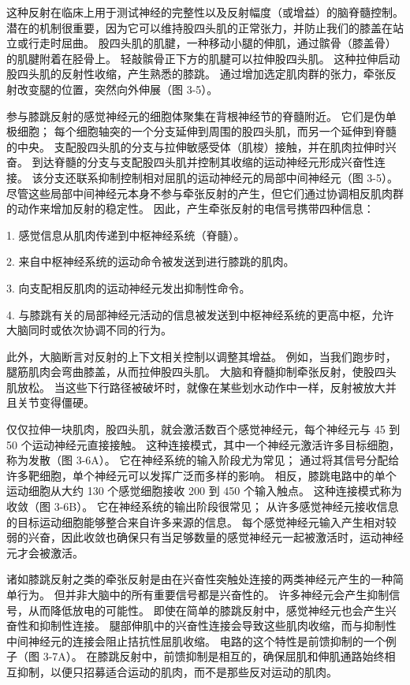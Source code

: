 这种反射在临床上用于测试神经的完整性以及反射幅度（或增益）的脑脊髓控制。 潜在的机制很重要，因为它可以维持股四头肌的正常张力，并防止我们的膝盖在站立或行走时屈曲。 股四头肌的肌腱，一种移动小腿的伸肌，通过髌骨（膝盖骨）的肌腱附着在胫骨上。 轻敲髌骨正下方的肌腱可以拉伸股四头肌。 这种拉伸启动股四头肌的反射性收缩，产生熟悉的膝跳。 通过增加选定肌肉群的张力，牵张反射改变腿的位置，突然向外伸展（图 3-5）。

参与膝跳反射的感觉神经元的细胞体聚集在背根神经节的脊髓附近。 它们是伪单极细胞； 每个细胞轴突的一个分支延伸到周围的股四头肌，而另一个延伸到脊髓的中央。 支配股四头肌的分支与拉伸敏感受体（肌梭）接触，并在肌肉拉伸时兴奋。 到达脊髓的分支与支配股四头肌并控制其收缩的运动神经元形成兴奋性连接。 该分支还联系抑制控制相对屈肌的运动神经元的局部中间神经元（图 3-5）。 尽管这些局部中间神经元本身不参与牵张反射的产生，但它们通过协调相反肌肉群的动作来增加反射的稳定性。 因此，产生牵张反射的电信号携带四种信息：

1. 感觉信息从肌肉传递到中枢神经系统（脊髓）。

2. 来自中枢神经系统的运动命令被发送到进行膝跳的肌肉。

3. 向支配相反肌肉的运动神经元发出抑制性命令。

4. 与膝跳有关的局部神经元活动的信息被发送到中枢神经系统的更高中枢，允许大脑同时或依次协调不同的行为。

此外，大脑断言对反射的上下文相关控制以调整其增益。 例如，当我们跑步时，腿筋肌肉会弯曲膝盖，从而拉伸股四头肌。 大脑和脊髓抑制牵张反射，使股四头肌放松。 当这些下行路径被破坏时，就像在某些划水动作中一样，反射被放大并且关节变得僵硬。

仅仅拉伸一块肌肉，股四头肌，就会激活数百个感觉神经元，每个神经元与 45 到 50 个运动神经元直接接触。 这种连接模式，其中一个神经元激活许多目标细胞，称为发散（图 3-6A）。 它在神经系统的输入阶段尤为常见； 通过将其信号分配给许多靶细胞，单个神经元可以发挥广泛而多样的影响。 相反，膝跳电路中的单个运动细胞从大约 130 个感觉细胞接收 200 到 450 个输入触点。 这种连接模式称为收敛（图 3-6B）。 它在神经系统的输出阶段很常见； 从许多感觉神经元接收信息的目标运动细胞能够整合来自许多来源的信息。 每个感觉神经元输入产生相对较弱的兴奋，因此收敛也确保只有当足够数量的感觉神经元一起被激活时，运动神经元才会被激活。

诸如膝跳反射之类的牵张反射是由在兴奋性突触处连接的两类神经元产生的一种简单行为。 但并非大脑中的所有重要信号都是兴奋性的。 许多神经元会产生抑制信号，从而降低放电的可能性。 即使在简单的膝跳反射中，感觉神经元也会产生兴奋性和抑制性连接。 腿部伸肌中的兴奋性连接会导致这些肌肉收缩，而与抑制性中间神经元的连接会阻止拮抗性屈肌收缩。 电路的这个特性是前馈抑制的一个例子（图 3-7A）。 在膝跳反射中，前馈抑制是相互的，确保屈肌和伸肌通路始终相互抑制，以便只招募适合运动的肌肉，而不是那些反对运动的肌肉。

